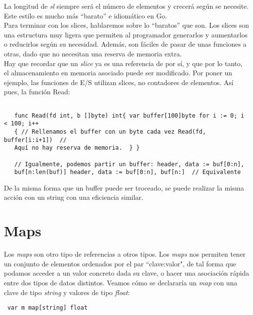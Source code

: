 La longitud de \textit{sl} siempre será el número de elementos y crecerá según
se necesite. Este estilo es mucho más ``barato'' e idiomático en Go.\\

Para terminar con los slices, hablaremos sobre lo ``baratos'' que son. Los
slices son una estructura muy ligera que permiten al programador generarlos
y aumentarlos o reducirlos según su necesidad. Además, son fáciles de pasar de
unas funciones a otras, dado que no necesitan una reserva de memoria extra.\\

Hay que recordar que un \textit{slice} ya es una referencia de por sí, y que por
lo tanto, el almacenamiento en memoria asociado puede ser modificado. Por poner
un ejemplo, las funciones de E/S utilizan slices, no contadores de elementos.
Así pues, la función Read:

\begin{verbatim}

   func Read(fd int, b []byte) int{ var buffer[100]byte for i := 0; i < 100; i++
   { // Rellenamos el buffer con un byte cada vez Read(fd, buffer[i:i+1])  //
   Aquí no hay reserva de memoria.  } }
   
   // Igualmente, podemos partir un buffer: header, data := buf[0:n],
   buf[n:len(buf)] header, data := buf[0:n], buf[n:]  // Equivalente
   \end{verbatim}

De la misma forma que un buffer puede ser troceado, se puede realizar la misma
acción con un string con una eficiencia similar.

\section{Maps}

Los \textit{maps} son otro tipo de referencias a otros tipos. Los \textit{maps}
nos permiten tener un conjunto de elementos ordenados por el par ``clave:valor",
de tal forma que podamos acceder a un valor concreto dada su clave, o hacer una
asociación rápida entre dos tipos de datos distintos. Veamos cómo se declararía
un \textit{map} con una clave de tipo \textit{string} y valores de tipo
\textit{float}:

\begin{verbatim} var m map[string] float \end{verbatim}

